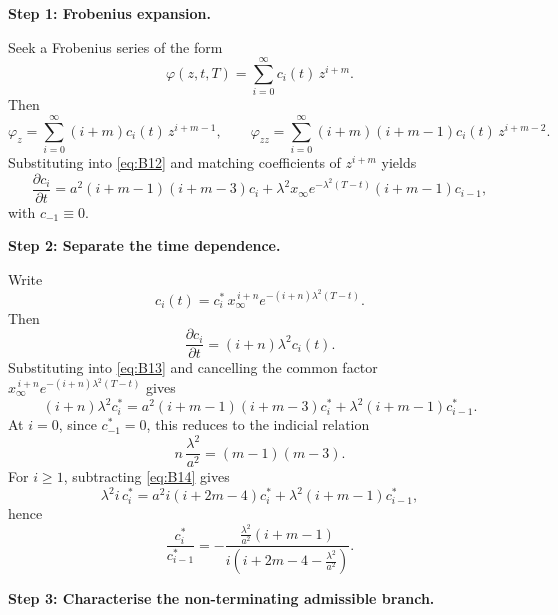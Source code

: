 \documentclass[12pt]{article}
\theoremstyle{statementstyle}
\begin{document}
\begin{appendices}
\medskip
\noindent\textbf{Step 1: Frobenius expansion.}

Seek a Frobenius series of the form
\[
\varphi(z,t,T)=\sum_{i=0}^{\infty} c_i(t)\,z^{i+m}.
\]
Then
\[
\varphi_z
=
\sum_{i=0}^{\infty}(i+m)c_i(t)\,z^{i+m-1},
\qquad
\varphi_{zz}
=
\sum_{i=0}^{\infty}(i+m)(i+m-1)c_i(t)\,z^{i+m-2}.
\]
Substituting into \eqref{eq:B12} and matching coefficients of \(z^{i+m}\) yields
\begin{equation}
\frac{\partial c_i}{\partial t}
=
a^{2}(i+m-1)(i+m-3)c_i
+
\lambda^{2}x_{\infty}e^{-\lambda^{2}(T-t)}(i+m-1)c_{i-1},
\tag{B.1.3}\label{eq:B13}
\end{equation}
with \(c_{-1}\equiv 0\).

\medskip
\noindent\textbf{Step 2: Separate the time dependence.}

Write
\[
c_i(t)=c_i^{*}\,x_{\infty}^{\,i+n}e^{-(i+n)\lambda^{2}(T-t)}.
\]
Then
\[
\frac{\partial c_i}{\partial t}=(i+n)\lambda^{2}c_i(t).
\]
Substituting into \eqref{eq:B13} and cancelling the common factor
\(x_{\infty}^{\,i+n}e^{-(i+n)\lambda^{2}(T-t)}\) gives
\[
(i+n)\lambda^{2}c_i^{*}
=
a^{2}(i+m-1)(i+m-3)c_i^{*}
+
\lambda^{2}(i+m-1)c_{i-1}^{*}.
\]
At \(i=0\), since \(c_{-1}^{*}=0\), this reduces to the indicial relation
\begin{equation}
n\,\frac{\lambda^{2}}{a^{2}}=(m-1)(m-3).
\tag{B.1.4}\label{eq:B14}
\end{equation}
For \(i\ge 1\), subtracting \eqref{eq:B14} gives
\[
\lambda^{2} i\,c_i^{*}
=
a^{2}i(i+2m-4)c_i^{*}
+
\lambda^{2}(i+m-1)c_{i-1}^{*},
\]
hence
\begin{equation}
\frac{c_i^{*}}{c_{i-1}^{*}}
=
-\frac{\frac{\lambda^{2}}{a^{2}}(i+m-1)}{i\left(i+2m-4-\frac{\lambda^{2}}{a^{2}}\right)}.
\tag{B.1.5}\label{eq:B15}
\end{equation}

\medskip
\noindent\textbf{Step 3: Characterise the non-terminating admissible branch.}


\end{appendices}
\end{document}
